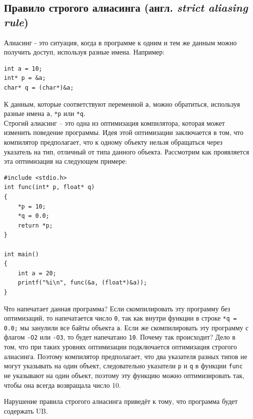 \documentclass{article}
\begin{document}
\subsection*{Правило строгого алиасинга (англ. \textit{strict aliasing rule})}
Алиасинг - это ситуация, когда в программе к одним и тем же данным можно получить доступ, используя разные имена. Например:
\begin{lstlisting}
int a = 10;
int* p = &a;
char* q = (char*)&a;
\end{lstlisting}
К данным, которые соответствуют переменной \texttt{a}, можно обратиться, используя разные имена \texttt{a}, \texttt{*p} или \texttt{*q}.\\
Строгий алиасинг -- это одна из оптимизация компилятора, которая может изменить поведение программы. Идея этой оптимизации заключается в том, что компилятор предполагает, что к одному объекту нельзя обращаться через указатель на тип, отличный от типа данного объекта. Рассмотрим как проявляется эта оптимизация на следующем примере:

\begin{lstlisting}
#include <stdio.h>
int func(int* p, float* q)
{
    *p = 10;
    *q = 0.0;
    return *p;
}

int main() 
{
    int a = 20;
    printf("%i\n", func(&a, (float*)&a));
}
\end{lstlisting}
Что напечатает данная программа? Если скомпилировать эту программу без оптимизаций, то напечатается число \texttt{0}, так как внутри функции в строке \texttt{*q = 0.0;} мы занулили все байты объекта \texttt{a}. Если же скомпилировать эту программу с флагом \texttt{-O2} или \texttt{-O3}, то будет напечатано \texttt{10}. Почему так происходит? Дело в том, что при таких уровнях оптимизации подключается оптимизация строгого алиасинга. Поэтому компилятор предполагает, что два указателя разных типов не могут указывать на один объект, следовательно указатели \texttt{p} и \texttt{q} в функции \texttt{func} не указывают на один объект, поэтому эту функцию можно оптимизировать так, чтобы она всегда возвращала число 10.

Нарушение правила строгого алиасинга приведёт к тому, что программа будет содержать UB. 
\end{document}
